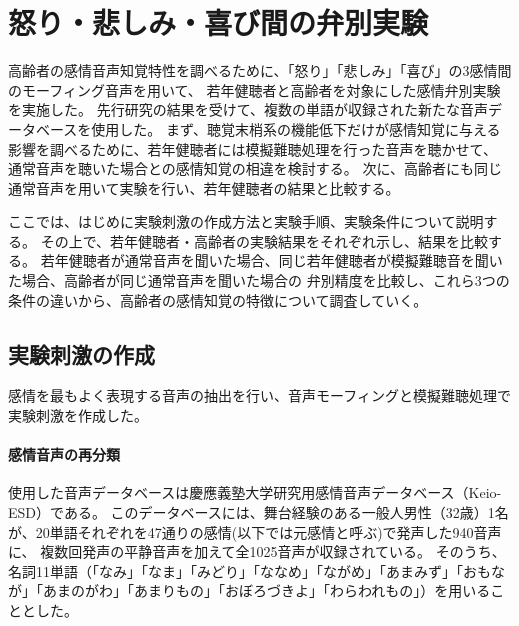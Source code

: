 \newpage
\chapter{怒り・悲しみ・喜び間の弁別実験}
\label{chap:ExpAngHapSad}

高齢者の感情音声知覚特性を調べるために、「怒り」「悲しみ」「喜び」の3感情間のモーフィング音声を用いて、
若年健聴者と高齢者を対象にした感情弁別実験を実施した。
先行研究\cite{hanatani2023Emo}の結果を受けて、複数の単語が収録された新たな音声データベース\cite{keioESD-J}を使用した。
まず、聴覚末梢系の機能低下だけが感情知覚に与える影響を調べるために、若年健聴者には模擬難聴処理を行った音声を聴かせて、
通常音声を聴いた場合との感情知覚の相違を検討する。
次に、高齢者にも同じ通常音声を用いて実験を行い、若年健聴者の結果と比較する。

ここでは、はじめに実験刺激の作成方法と実験手順、実験条件について説明する。
その上で、若年健聴者・高齢者の実験結果をそれぞれ示し、結果を比較する。
若年健聴者が通常音声を聞いた場合、同じ若年健聴者が模擬難聴音を聞いた場合、高齢者が同じ通常音声を聞いた場合の
弁別精度を比較し、これら3つの条件の違いから、高齢者の感情知覚の特徴について調査していく。

\section{実験刺激の作成}
\label{sec:PrepareStimuli}
感情を最もよく表現する音声の抽出を行い、音声モーフィングと模擬難聴処理で実験刺激を作成した。
\subsubsection{感情音声の再分類}
使用した音声データベースは慶應義塾大学研究用感情音声データベース（Keio-ESD）\cite{keioESD-J}である。
このデータベースには、舞台経験のある一般人男性（32歳）1名が、20単語それぞれを47通りの感情(以下では元感情と呼ぶ)で発声した940音声に、
複数回発声の平静音声を加えて全1025音声が収録されている。
そのうち、名詞11単語（「なみ」「なま」「みどり」「ななめ」「ながめ」「あまみず」「おもなが」「あまのがわ」「あまりもの」「おぼろづきよ」「わらわれもの」）を用いることとした。

